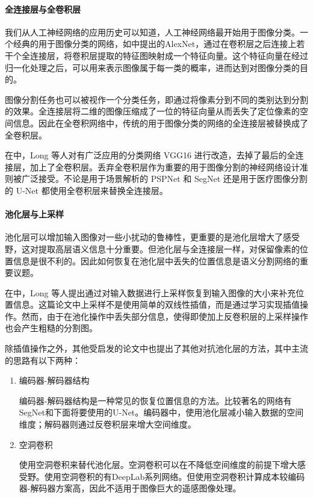 \paragraph{全连接层与全卷积层}
我们从人工神经网络的应用历史可以知道，人工神经网络最开始用于图像分类。一个经典的用于图像分类的网络，如\cite{krizhevsky2012imagenet}中提出的AlexNet，通过在卷积层之后连接上若干个全连接层，将卷积层提取的特征图映射成一个特征向量。这个特征向量在经过归一化处理之后，可以用来表示图像属于每一类的概率，进而达到对图像分类的目的。

图像分割任务也可以被视作一个分类任务，即通过将像素分到不同的类别达到分割的效果。全连接层将二维的图像压缩成了一位的特征向量从而丢失了定位像素的空间信息。因此在全卷积网络中，传统的用于图像分类的网络的全连接层被替换成了全卷积层。

在\cite{long2015fully}中，Long 等人对有广泛应用的分类网络 VGG16\cite{simonyan2014very} 进行改造，去掉了最后的全连接层，加上了全卷积层。丢弃全卷积层作为重要的用于图像分割的神经网络设计准则被广泛接受。不论是用于场景解析的 PSPNet\cite{zhao2017pyramid} 和 SegNet\cite{badrinarayanan2017segnet} 还是用于医疗图像分割的 U-Net\cite{ronneberger2015u} 都使用全卷积层来替换全连接层。


\paragraph{池化层与上采样}
池化层可以增加输入图像对一些小扰动的鲁棒性，更重要的是池化层增大了感受野，这对提取高层语义信息十分重要。但池化层与全连接层一样，对保留像素的位置信息是很不利的。因此如何恢复在池化层中丢失的位置信息是语义分割网络的重要议题。

在\cite{long2015fully}中，Long 等人提出通过对输入数据进行上采样恢复到输入图像的大小来补充位置信息。这篇论文中上采样不是使用简单的双线性插值，而是通过学习实现插值操作。然而，由于在池化操作中丢失部分信息，使得即使加上反卷积层的上采样操作也会产生粗糙的分割图。

除插值操作之外，其他受\cite{long2015fully}启发的论文中也提出了其他对抗池化层的方法，其中主流的思路有以下两种：

\begin{enumerate}
    \item 编码器-解码器结构
    
    编码器-解码器结构是一种常见的恢复位置信息的方法。比较著名的网络有SegNet\cite{badrinarayanan2017segnet}和下面将要使用的U-Net\cite{ronneberger2015u}。编码器中，使用池化层减小输入数据的空间维度；解码器则通过反卷积层来增大空间维度。
    \item 空洞卷积
    
    使用空洞卷积来替代池化层。空洞卷积可以在不降低空间维度的前提下增大感受野。使用空洞卷积的有DeepLab\cite{chen2014semantic}系列网络。但使用空洞卷积计算成本较编码器-解码器方案高，因此不适用于图像巨大的遥感图像处理。
\end{enumerate}
